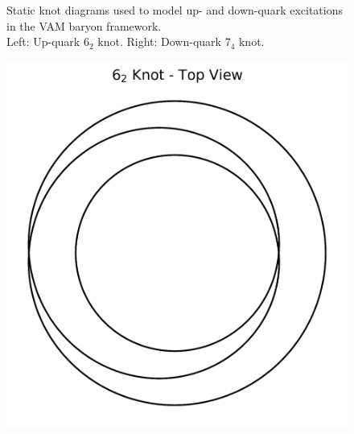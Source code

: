 \documentclass[12pt]{article}
\begin{document}
\begin{figure}[H]
\begin{minipage}{0.25\textwidth}
\end{minipage}
    \caption{Static knot diagrams used to model up- and down-quark excitations in the VAM baryon framework.\\
            Left: Up-quark \(6_2\) knot. Right: Down-quark \(7_4\) knot.}
\end{figure}


\begin{figure}[H]
\centering
\begin{minipage}{0.25\textwidth}
    \centering
             \includegraphics[width=\textwidth]{images/knot_6_2_topview.png}
\end{minipage}
\hspace{1em}
\begin{minipage}{0.25\textwidth}
    \centering

\end{minipage}
\end{figure}
\end{document}
